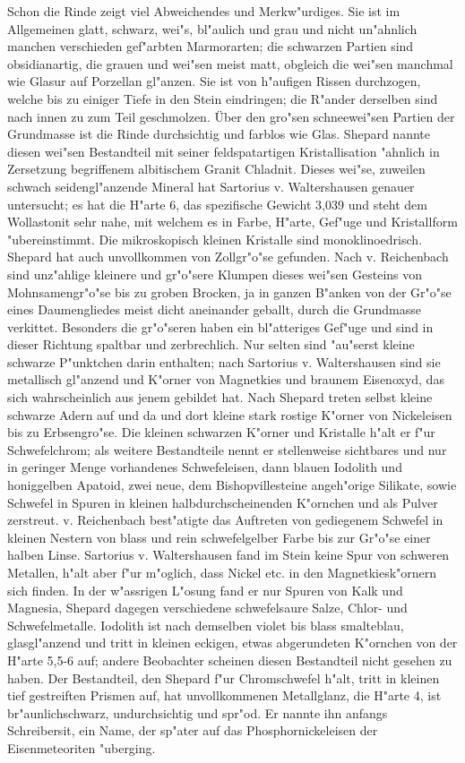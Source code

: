\documentclass[a4paper, 11pt, oneside]{article}
\begin{document}
Schon die Rinde zeigt viel Abweichendes und Merkw"urdiges. Sie ist im Allgemeinen glatt, schwarz, wei"s, bl"aulich und grau und nicht un"ahnlich manchen verschieden gef"arbten Marmorarten; die schwarzen Partien sind obsidianartig, die grauen und wei"sen meist matt, obgleich die wei"sen manchmal wie Glasur auf Porzellan gl"anzen. Sie ist von h"aufigen Rissen durchzogen, welche bis zu einiger Tiefe in den Stein eindringen; die R"ander derselben sind nach innen zu zum Teil geschmolzen. Über den gro"sen schneewei"sen Partien der Grundmasse ist die Rinde durchsichtig und farblos wie Glas. Shepard nannte diesen wei"sen Bestandteil mit seiner feldspatartigen Kristallisation "ahnlich in Zersetzung begriffenem albitischem Granit Chladnit. Dieses wei"se, zuweilen schwach seidengl"anzende Mineral hat Sartorius v. Waltershausen genauer untersucht; es hat die H"arte 6, das spezifische Gewicht 3,039 und steht dem Wollastonit sehr nahe, mit welchem es in Farbe, H"arte, Gef"uge und Kristallform "ubereinstimmt. Die mikroskopisch kleinen Kristalle sind monoklinoedrisch. Shepard hat auch unvollkommen von Zollgr"o"se gefunden. Nach v. Reichenbach sind unz"ahlige kleinere und gr"o"sere Klumpen dieses wei"sen Gesteins von Mohnsamengr"o"se bis zu groben Brocken, ja in ganzen B"anken von der Gr"o"se eines Daumengliedes meist dicht aneinander geballt, durch die Grundmasse verkittet. Besonders die gr"o"seren haben ein bl"atteriges Gef"uge und sind in dieser Richtung spaltbar und zerbrechlich. Nur selten sind "au"serst kleine schwarze P"unktchen darin enthalten; nach Sartorius v. Waltershausen sind sie metallisch gl"anzend und K"orner von Magnetkies und braunem Eisenoxyd, das sich wahrscheinlich aus jenem gebildet hat. Nach Shepard treten selbst kleine schwarze Adern auf und da und dort kleine stark rostige K"orner von Nickeleisen bis zu Erbsengro"se. Die kleinen schwarzen K"orner und Kristalle h"alt er f"ur Schwefelchrom; als weitere Bestandteile nennt er stellenweise sichtbares und nur in geringer Menge vorhandenes Schwefeleisen, dann blauen Iodolith und honiggelben Apatoid, zwei neue, dem Bishopvillesteine angeh"orige Silikate, sowie Schwefel in Spuren in kleinen halbdurchscheinenden K"ornchen und als Pulver zerstreut. v. Reichenbach best"atigte das Auftreten von gediegenem Schwefel in kleinen Nestern von blass und rein schwefelgelber Farbe bis zur Gr"o"se einer halben Linse. Sartorius v. Waltershausen fand im Stein keine Spur von schweren Metallen, h"alt aber f"ur m"oglich, dass Nickel etc. in den Magnetkiesk"ornern sich finden. In der w"assrigen L"osung fand er nur Spuren von Kalk und Magnesia, Shepard dagegen verschiedene schwefelsaure Salze, Chlor- und Schwefelmetalle. Iodolith ist nach demselben violet bis blass smalteblau, glasgl"anzend und tritt in kleinen eckigen, etwas abgerundeten K"ornchen von der H"arte 5,5-6 auf; andere Beobachter scheinen diesen Bestandteil nicht gesehen zu haben. Der Bestandteil, den Shepard f"ur Chromschwefel h"alt, tritt in kleinen tief gestreiften Prismen auf, hat unvollkommenen Metallglanz, die H"arte 4, ist br"aunlichschwarz, undurchsichtig und spr"od. Er nannte ihn anfangs Schreibersit, ein Name, der sp"ater auf das Phosphornickeleisen der Eisenmeteoriten "uberging.
\end{document}
